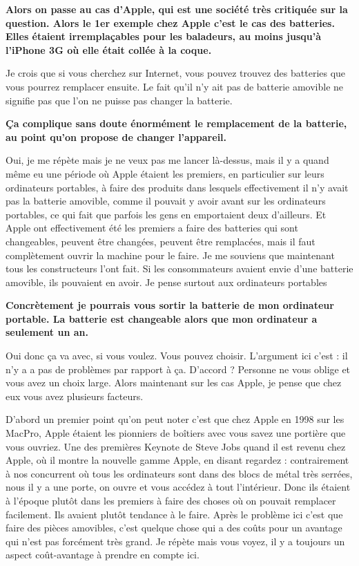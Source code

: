 \begin{small}
\textbf{Alors on passe au cas d'Apple, qui est une société très critiquée sur la question. Alors le 1er exemple chez Apple c'est le cas des batteries. Elles étaient irremplaçables pour les baladeurs, au moins jusqu'à l'iPhone 3G où elle était collée à la coque.}
\smallbreak


Je crois que si vous cherchez sur Internet, vous pouvez trouvez des batteries que vous pourrez remplacer ensuite. Le fait qu'il n'y ait pas de batterie amovible ne signifie pas que l'on ne puisse pas changer la batterie. 

\textbf{Ça complique sans doute énormément le remplacement de la batterie, au point qu'on propose de changer l'appareil.}
\smallbreak


Oui, je me répète mais je ne veux pas me lancer là-dessus, mais il y a quand même eu une période où Apple étaient les premiers, en particulier sur leurs ordinateurs portables, à faire des produits dans lesquels effectivement il n'y avait pas la batterie amovible, comme il pouvait y avoir avant sur les ordinateurs portables, ce qui fait que parfois les gens en emportaient deux d'ailleurs. Et Apple ont effectivement été les premiers a faire des batteries qui sont changeables, peuvent être changées, peuvent être remplacées, mais il faut complètement ouvrir la machine pour le faire. Je me souviens que maintenant tous les constructeurs l'ont fait. Si les consommateurs avaient envie d'une batterie amovible, ils pouvaient en avoir. Je pense surtout aux ordinateurs portables

\textbf{Concrètement je pourrais vous sortir la batterie de mon ordinateur portable. La batterie est changeable alors que mon ordinateur a seulement un an.}
\smallbreak


Oui donc ça va avec, si vous voulez. Vous pouvez choisir. L'argument ici c'est : il n'y a a pas de problèmes par rapport à ça. D'accord ? Personne ne vous oblige et vous avez un choix large. Alors maintenant sur les cas Apple, je pense que chez eux vous avez plusieurs facteurs.

D'abord un premier point qu'on peut noter c'est que chez Apple en 1998 sur les MacPro, Apple étaient les pionniers de boîtiers avec vous savez une portière que vous ouvriez. Une des premières Keynote de Steve Jobs quand il est revenu chez Apple, où il montre la nouvelle gamme Apple, en disant regardez : contrairement à nos concurrent où tous les ordinateurs sont dans des blocs de métal très serrées, nous il y a une porte, on ouvre et vous accédez à tout l'intérieur. Donc ils étaient à l'époque plutôt dans les premiers à faire des choses où on pouvait remplacer facilement. Ils avaient plutôt tendance à le faire.
Après le problème ici c'est que faire des pièces amovibles, c'est quelque chose qui a des coûts pour un avantage qui n'est pas forcément très grand. Je répète mais vous voyez, il y a toujours un aspect coût-avantage à prendre en compte ici. 


\end{small}
